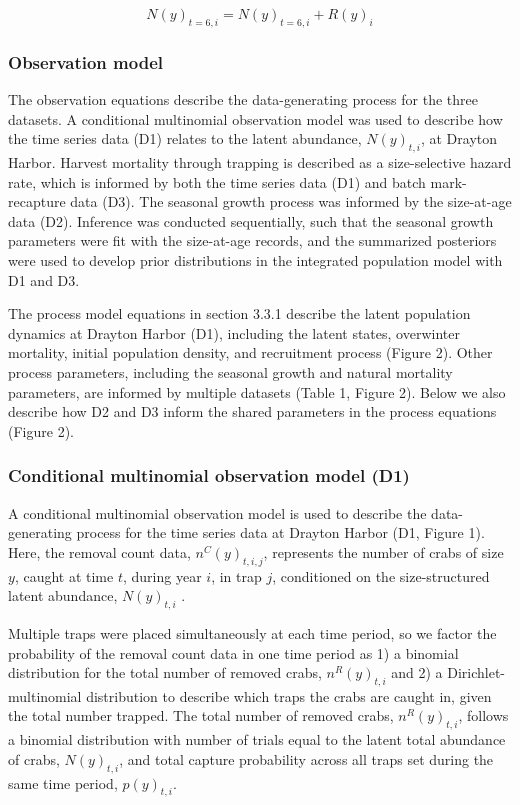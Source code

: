 \documentclass{article}
\begin{document}
\begin{equation}
N(y)_{t=6, i} =  N(y)_{t=6, i} + R(y)_{i}
\end{equation}

\subsubsection{Observation model}

The observation equations describe the data-generating process for the three datasets. A conditional multinomial observation model was used to describe how the time series data (D1) relates to the latent abundance, $N(y)_{t,i}$, at Drayton Harbor. Harvest mortality through trapping is described as a size-selective hazard rate, which is informed by both the time series data (D1) and batch mark-recapture data (D3). The seasonal growth process was informed by the size-at-age data (D2). Inference was conducted sequentially, such that the seasonal growth parameters were fit with the size-at-age records, and the summarized posteriors were used to develop prior distributions in the integrated population model with D1 and D3.

The process model equations in section 3.3.1 describe the latent population dynamics at Drayton Harbor (D1), including the latent states, overwinter mortality, initial population density, and recruitment process (Figure 2). Other process parameters, including the seasonal growth and natural mortality parameters, are informed by multiple datasets (Table 1, Figure 2). Below we also describe how D2 and D3 inform the shared parameters in the process equations (Figure 2).

\subsubsection*{Conditional multinomial observation model (D1)}

A conditional multinomial observation model is used to describe the data-generating process for the time series data at Drayton Harbor (D1, Figure 1). Here, the removal count data, $n^C(y)_{t,i,j}$, represents the number of crabs of size $y$, caught at time $t$, during year $i$, in trap $j$, conditioned on the size-structured latent abundance, $N(y)_{t,i}$ \parencite{kery2015modeling}. 

Multiple traps were placed simultaneously at each time period, so we factor the probability of the removal count data in one time period as 1) a binomial distribution for the total number of removed crabs, $n^R(y)_{t,i}$ and 2) a Dirichlet-multinomial distribution to describe which traps the crabs are caught in, given the total number trapped. The total number of removed crabs, $n^R(y)_{t,i}$, follows a binomial distribution with number of trials equal to the latent total abundance of crabs, $N(y)_{t,i}$, and total capture probability across all traps set during the same time period, $p(y)_{t,i}$.
\end{document}
